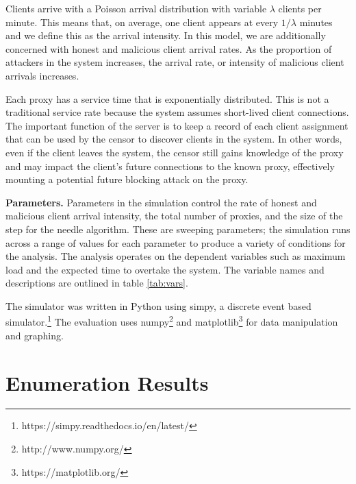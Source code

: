 Clients arrive with a Poisson arrival distribution with variable $\lambda$ clients per minute. This means that, on average, one client appears at every $1 / \lambda$ minutes and we define this as the arrival intensity. In this model, we are additionally concerned with honest and malicious client arrival rates. As the proportion of attackers in the system increases, the arrival rate, or intensity of malicious client arrivals increases.

Each proxy has a service time that is exponentially distributed. This is not a traditional service rate because the system assumes short-lived client connections. The important function of the server is to keep a record of each client assignment that can be used by the censor to discover clients in the system. In other words, even if the client leaves the system, the censor still gains knowledge of the proxy and may impact the client's future connections to the known proxy, effectively mounting a potential future blocking attack on the proxy.

\textbf{Parameters.} Parameters in the simulation control the rate of honest and malicious client arrival intensity, the total number of proxies, and the size of the step for the needle algorithm. These are sweeping parameters; the simulation runs across a range of values for each parameter to produce a variety of conditions for the analysis. The analysis operates on the dependent variables such as maximum load and the expected time to overtake the system. The variable names and descriptions are outlined in table \ref{tab:vars}.

The simulator was written in Python using simpy, a discrete event based simulator.\footnote{https://simpy.readthedocs.io/en/latest/} The evaluation uses numpy\footnote{http://www.numpy.org/} and matplotlib\footnote{https://matplotlib.org/} for data manipulation and graphing.

\section{Enumeration Results}


